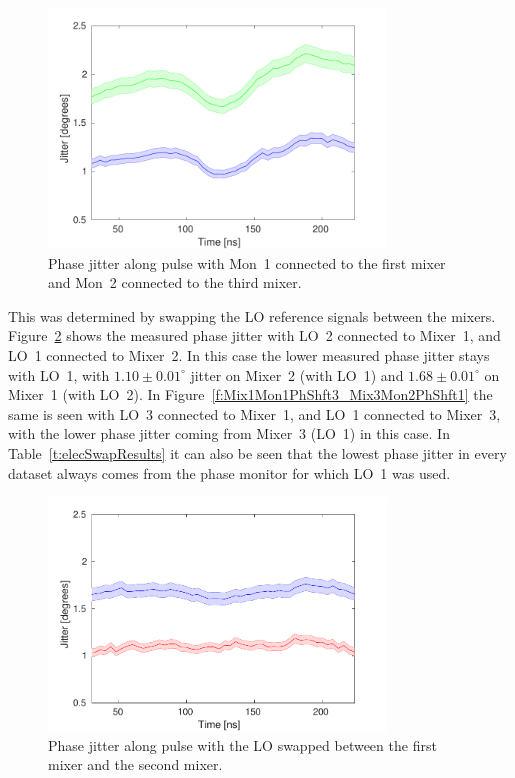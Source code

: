 \begin{figure}
  \centering
  \includegraphics[width=0.8\textwidth]{Figures/phaseMons/Mix1Mon1_Mix3Mon2}
  \caption{Phase jitter along pulse with Mon~1 connected to the first mixer and Mon~2 connected to the third mixer.}
  \label{f:Mix1Mon1_Mix3Mon2}
\end{figure}

This was determined by swapping the LO reference signals between the mixers. Figure~\ref{f:Mix1Mon1PhShft2_Mix2Mon2PhShft1} shows the measured phase jitter with LO~2 connected to Mixer~1, and LO~1 connected to Mixer~2. In this case the lower measured phase jitter stays with LO~1, with \(1.10\pm0.01^\circ\) jitter on Mixer~2 (with LO~1) and \(1.68\pm0.01^\circ\) on Mixer~1 (with LO~2). In Figure~\ref{f:Mix1Mon1PhShft3_Mix3Mon2PhShft1} the same is seen with LO~3 connected to Mixer~1, and LO~1 connected to Mixer~3, with the lower phase jitter coming from Mixer~3 (LO~1) in this case. In Table~\ref{t:elecSwapResults} it can also be seen that the lowest phase jitter in every dataset always comes from the phase monitor for which LO~1 was used.

\begin{figure}
  \centering
  \includegraphics[width=0.8\textwidth]{Figures/phaseMons/Mix1Mon1PhShft2_Mix2Mon2PhShft1}
  \caption{Phase jitter along pulse with the LO swapped between the first mixer and the second mixer.}
  \label{f:Mix1Mon1PhShft2_Mix2Mon2PhShft1}
\end{figure}

